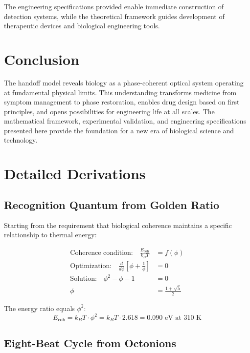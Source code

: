 \documentclass[12pt,twocolumn]{article}
\begin{document}
The engineering specifications provided enable immediate construction of detection systems, while the theoretical framework guides development of therapeutic devices and biological engineering tools.

\section{Conclusion}

The handoff model reveals biology as a phase-coherent optical system operating at fundamental physical limits. This understanding transforms medicine from symptom management to phase restoration, enables drug design based on first principles, and opens possibilities for engineering life at all scales. The mathematical framework, experimental validation, and engineering specifications presented here provide the foundation for a new era of biological science and technology.

\appendix

\section{Detailed Derivations}

\subsection{Recognition Quantum from Golden Ratio}

Starting from the requirement that biological coherence maintains a specific relationship to thermal energy:

\begin{align}
\text{Coherence condition:} \quad \frac{E_{\text{coh}}}{k_B T} &= f(\phi) \\
\text{Optimization:} \quad \frac{d}{d\phi}\left[\phi + \frac{1}{\phi}\right] &= 0 \\
\text{Solution:} \quad \phi^2 - \phi - 1 &= 0 \\
\phi &= \frac{1 + \sqrt{5}}{2}
\end{align}

The energy ratio equals $\phi^2$:
\begin{equation}
E_{\text{coh}} = k_B T \cdot \phi^2 = k_B T \cdot 2.618 = 0.090 \text{ eV at 310 K}
\end{equation}

\subsection{Eight-Beat Cycle from Octonions}
\end{document}
